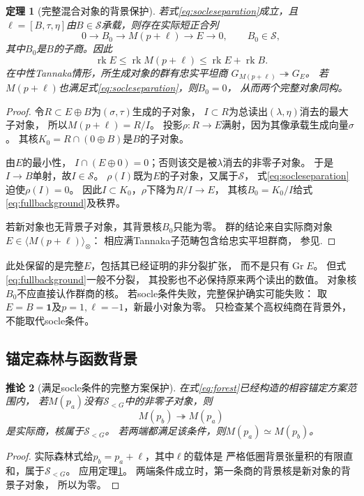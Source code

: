 \documentclass[11pt,a4paper]{ctexart}
\theoremstyle{cnplain}\newtheorem{theorem}{定理}[section]
\newtheorem{corollary}[theorem]{推论}
\theoremstyle{definition}\newtheorem{definition}[theorem]{定义}
\theoremstyle{remark}\newtheorem{remark}[theorem]{注}
\newcommand{\cS}{\mathcal S}\newcommand{\dR}{\mathrm{dR}}
\newcommand{\rk}{\operatorname{rk}}\newcommand{\im}{\operatorname{im}}
\begin{document}
\begin{theorem}[完整混合对象的背景保护]\label{thm:fullbackground}
若式\eqref{eq:socleseparation}成立，且
$\ell=[B,\tau,\eta]$由$B\in\cS$承载，则存在实际短正合列
\begin{equation}\label{eq:fullbackground}
 0\longrightarrow B_0\longrightarrow M(p+\ell)
 \longrightarrow E\longrightarrow0,\qquad B_0\in\cS,
\end{equation}
其中$B_0$是$B$的子商。因此
\[
 \rk E\le\rk M(p+\ell)\le\rk E+\rk B.
\]
在中性Tannaka情形，所生成对象的群有忠实平坦商
$G_{M(p+\ell)}\twoheadrightarrow G_E$。
若$M(p+\ell)$也满足式\eqref{eq:socleseparation}，则$B_0=0$，
从而两个完整对象同构。
\end{theorem}
\begin{proof}
令$R\subset E\oplus B$为$(\sigma,\tau)$生成的子对象，
$I\subset R$为总读出$(\lambda,\eta)$消去的最大子对象，
所以$M(p+\ell)=R/I$。
投影$\rho:R\to E$满射，因为其像承载生成向量$\sigma$。
其核$K_0=R\cap(0\oplus B)$是$B$的子对象。

由$E$的最小性，
$I\cap(E\oplus0)=0$；否则该交是被$\lambda$消去的非零子对象。
于是$I\to B$单射，故$I\in\cS$。
$\rho(I)$既为$E$的子对象，又属于$\cS$，
式\eqref{eq:socleseparation}迫使$\rho(I)=0$。
因此$I\subset K_0$，$\rho$下降为$R/I\to E$，
其核$B_0=K_0/I$给式\eqref{eq:fullbackground}及秩界。

若新对象也无背景子对象，其背景核$B_0$只能为零。
群的结论来自实际商对象$E\in\langle M(p+\ell)\rangle_\otimes$：
相应满Tannaka子范畴包含给忠实平坦群商，
参见\cite[Proposition2.21]{DM}.
\end{proof}

此处保留的是完整$E$，包括其已经证明的非分裂扩张，
而不是只有$\operatorname{Gr}E$。
但式\eqref{eq:fullbackground}一般不分裂，
其投影也不必保持原来两个读出的数值。
对象核$B_0$不应直接认作群商的核。
若socle条件失败，完整保护确实可能失败：
取$E=B=\mathbf1$及$p=1,\ell=-1$，新最小对象为零。
只检查某个高权纯商在背景外，不能取代socle条件。

\subsection{锚定森林与函数背景}
\begin{corollary}[满足socle条件的完整方案保护]\label{cor:fullforest}
在式\eqref{eq:forest}已经构造的相容锚定方案范围内，
若$M(p_a)$没有$\cS_{<G}$中的非零子对象，则
\[
 M(p_b)\twoheadrightarrow M(p_a)
\]
是实际商，核属于$\cS_{<G}$。
若两端都满足该条件，则$M(p_a)\simeq M(p_b)$。
\end{corollary}
\begin{proof}
实际森林式给$p_b=p_a+\ell$，其中$\ell$的载体是
严格低圈背景张量积的有限直和，属于$\cS_{<G}$。
应用定理\ref{thm:fullbackground}。
两端条件成立时，第一条商的背景核是新对象的背景子对象，
所以为零。
\end{proof}
\end{document}
